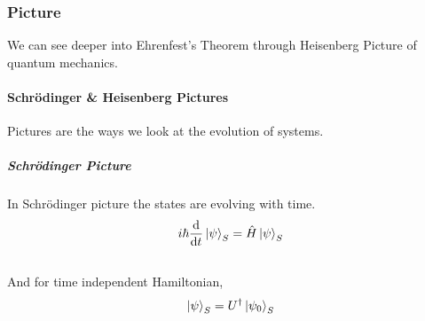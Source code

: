 \documentclass[letterpaper,10pt,english]{sphinxmanual}
\def\d{{\rm d}}
\newcommand{\ket}[1]{\left| #1\right\rangle}
\begin{document}
\subsubsection{Picture}
\label{QuantumMechanics:picture}
We can see deeper into Ehrenfest's Theorem through Heisenberg Picture of quantum mechanics.


\paragraph{Schrödinger \& Heisenberg Pictures}
\label{QuantumMechanics:schrodinger-heisenberg-pictures}
Pictures are the ways we look at the evolution of systems.


\subparagraph{Schrödinger Picture}
\label{QuantumMechanics:schrodinger-picture}
In Schrödinger picture the states are evolving with time.
\begin{gather}
\begin{split}i\hbar \frac{\d}{\d t} \ket{\psi} _ S = \hat H \ket{\psi} _ S\end{split}\notag\\\begin{split}\end{split}\notag
\end{gather}
And for time independent Hamiltonian,
\begin{gather}
\begin{split}\ket{\psi}_S = U^\dagger \ket{\psi _ 0} _ S\end{split}\notag\\\begin{split}\end{split}\notag
\end{gather}
\end{document}
